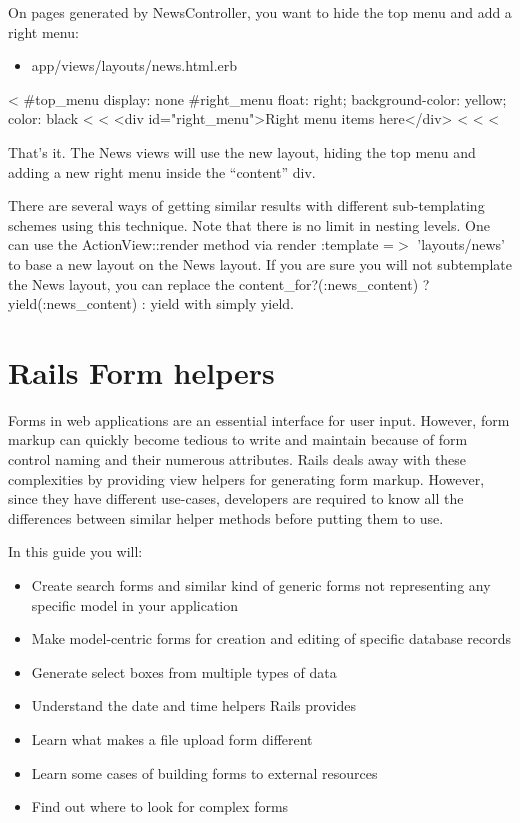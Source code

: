 \documentclass[10pt]{book}
\newenvironment{code}{%
  \scriptsize
    \verbatim
}{%
    \endverbatim
    \newline
}
\begin{document}
On pages generated by NewsController, you want to hide the top menu and add a right menu:
\begin{itemize}
	\item app/views/layouts/news.html.erb
\end{itemize}
\begin{code}
<%
  #top_menu {display: none}
  #right_menu {float: right; background-color: yellow; color: black}
<%
<%
  <div id="right_menu">Right menu items here</div>
  <%
<%
<%
\end{code}

That’s it. The News views will use the new layout, hiding the top menu and adding a new right menu inside the “content” div.

There are several ways of getting similar results with different  sub-templating schemes using this technique. Note that there is no limit  in nesting levels. One can use the ActionView::render method via render :template =$>$ 'layouts/news' to base a new layout on the News layout. If you are sure you will not subtemplate the News layout, you can replace the content\_for?(:news\_content) ? yield(:news\_content) : yield with simply yield.

\chapter{Rails Form helpers}

Forms in web applications are an essential interface for user input.  However, form markup can quickly become tedious to write and maintain  because of form control naming and their numerous attributes. Rails  deals away with these complexities by providing view helpers for  generating form markup. However, since they have different use-cases,  developers are required to know all the differences between similar  helper methods before putting them to use.

In this guide you will:
\begin{itemize}
	\item Create search forms and similar kind of generic forms not representing any specific model in your application
	\item Make model-centric forms for creation and editing of specific database records
	\item Generate select boxes from multiple types of data
	\item Understand the date and time helpers Rails provides
	\item Learn what makes a file upload form different
	\item Learn some cases of building forms to external resources
	\item Find out where to look for complex forms
\end{itemize}
\end{document}

